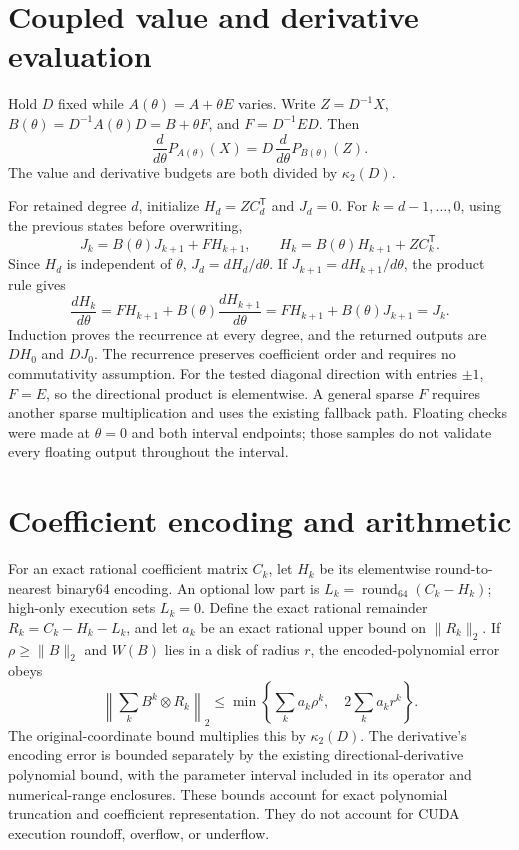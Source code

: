 \documentclass[10pt]{article}
\begin{document}
\section{Coupled value and derivative evaluation}

Hold $D$ fixed while $A(\theta)=A+\theta E$ varies. Write $Z=D^{-1}X$, $B(\theta)=D^{-1}A(\theta)D=B+\theta F$, and $F=D^{-1}ED$. Then
\[
\frac{d}{d\theta}P_{A(\theta)}(X)
=D\,\frac{d}{d\theta}P_{B(\theta)}(Z).
\]
The value and derivative budgets are both divided by $\kappa_2(D)$.

For retained degree $d$, initialize $H_d=ZC_d^{\mathsf T}$ and $J_d=0$. For $k=d-1,\ldots,0$, using the previous states before overwriting,
\[
J_k=B(\theta)J_{k+1}+F H_{k+1},\qquad
H_k=B(\theta)H_{k+1}+ZC_k^{\mathsf T}.
\]
Since $H_d$ is independent of $\theta$, $J_d=dH_d/d\theta$. If $J_{k+1}=dH_{k+1}/d\theta$, the product rule gives
\[
\frac{dH_k}{d\theta}
=F H_{k+1}+B(\theta)\frac{dH_{k+1}}{d\theta}
=F H_{k+1}+B(\theta)J_{k+1}=J_k.
\]
Induction proves the recurrence at every degree, and the returned outputs are $DH_0$ and $DJ_0$. The recurrence preserves coefficient order and requires no commutativity assumption. For the tested diagonal direction with entries $\pm1$, $F=E$, so the directional product is elementwise. A general sparse $F$ requires another sparse multiplication and uses the existing fallback path. Floating checks were made at $\theta=0$ and both interval endpoints; those samples do not validate every floating output throughout the interval.

\section{Coefficient encoding and arithmetic}

For an exact rational coefficient matrix $C_k$, let $H_k$ be its elementwise round-to-nearest binary64 encoding. An optional low part is $L_k=\operatorname{round}_{64}(C_k-H_k)$; high-only execution sets $L_k=0$. Define the exact rational remainder $R_k=C_k-H_k-L_k$, and let $a_k$ be an exact rational upper bound on $\|R_k\|_2$. If $\rho\ge\|B\|_2$ and $W(B)$ lies in a disk of radius $r$, the encoded-polynomial error obeys
\[
\left\|\sum_k B^k\otimes R_k\right\|_2
\le
\min\left\{\sum_k a_k\rho^k,\quad 2\sum_k a_k r^k\right\}.
\]
The original-coordinate bound multiplies this by $\kappa_2(D)$. The derivative's encoding error is bounded separately by the existing directional-derivative polynomial bound, with the parameter interval included in its operator and numerical-range enclosures. These bounds account for exact polynomial truncation and coefficient representation. They do not account for CUDA execution roundoff, overflow, or underflow.
\end{document}
